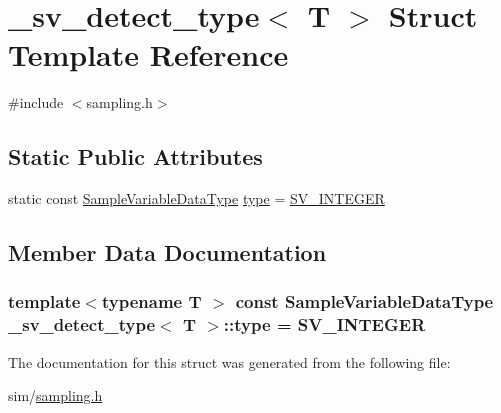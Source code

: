 \hypertarget{struct__sv__detect__type}{\section{\+\_\+sv\+\_\+detect\+\_\+type$<$ T $>$ Struct Template Reference}
\label{struct__sv__detect__type}
}


{\ttfamily \#include $<$sampling.\+h$>$}

\subsection*{Static Public Attributes}
\begin{DoxyCompactItemize}
\item 
static const \hyperlink{sampling_8h_aebe1c9f7e0bdb2dfac88bf77cf6c695e}{Sample\+Variable\+Data\+Type} \hyperlink{struct__sv__detect__type_a09e0b3d19928e093dd5df2c2bff92297}{type} = \hyperlink{sampling_8h_aebe1c9f7e0bdb2dfac88bf77cf6c695eab28043966ee32c64d4952f244e45d0cc}{S\+V\+\_\+\+I\+N\+T\+E\+G\+E\+R}
\end{DoxyCompactItemize}


\subsection{Member Data Documentation}
\hypertarget{struct__sv__detect__type_a09e0b3d19928e093dd5df2c2bff92297}{
\subsubsection[{type}]{\setlength{\rightskip}{0pt plus 5cm}template$<$typename T $>$ const {\bf Sample\+Variable\+Data\+Type} {\bf \+\_\+sv\+\_\+detect\+\_\+type}$<$ T $>$\+::type = {\bf S\+V\+\_\+\+I\+N\+T\+E\+G\+E\+R}\hspace{0.3cm}{\ttfamily [static]}}}\label{struct__sv__detect__type_a09e0b3d19928e093dd5df2c2bff92297}


The documentation for this struct was generated from the following file\+:\begin{DoxyCompactItemize}
\item 
sim/\hyperlink{sampling_8h}{sampling.\+h}\end{DoxyCompactItemize}
